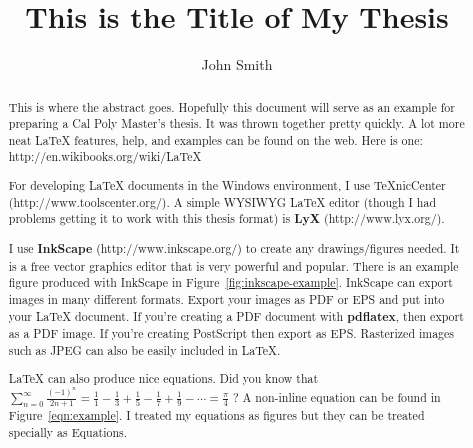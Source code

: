 \documentclass[12pt]{ucthesis}
\begin{document}

\title{This is the Title of My Thesis}
\author{John Smith}
  
 
     



\maketitle

\begin{frontmatter}

\copyrightpage

\committeemembershippage

\begin{abstract}

This is where the abstract goes.  Hopefully this document will serve as an example for preparing a Cal Poly Master's thesis.  It was thrown together pretty quickly.  A lot more neat LaTeX features, help, and examples can be found on the web.  Here is one: http://en.wikibooks.org/wiki/LaTeX

For developing LaTeX documents in the Windows environment, I use TeXnicCenter (http://www.toolscenter.org/).  A simple WYSIWYG LaTeX editor (though I had problems getting it to work with this thesis format) is \textbf{LyX} (http://www.lyx.org/).

I use \textbf{InkScape} (http://www.inkscape.org/) to create any drawings/figures needed.  It is a free vector graphics editor that is very powerful and popular.  There is an example figure produced with InkScape in Figure~\ref{fig:inkscape-example}.  InkScape can export images in many different formats.  Export your images as PDF or EPS and put into your LaTeX document.  If you're creating a PDF document with \textbf{pdflatex}, then export as a PDF image.  If you're creating PostScript then export as EPS.  Rasterized images such as JPEG can also be easily included in LaTeX.

LaTeX can also produce nice equations.  Did you know that $\sum_{n=0}^{\infty} \frac{(-1)^n}{2n+1} = \frac{1}{1} - \frac{1}{3} + \frac{1}{5} - \frac{1}{7} + \frac{1}{9} - \cdots = \frac{\pi}{4}$ ?  A non-inline equation can be found in Figure~\ref{eqn:example}.  I treated my equations as figures but they can be treated specially as Equations.


\end{abstract}
\end{frontmatter}
\end{document}
